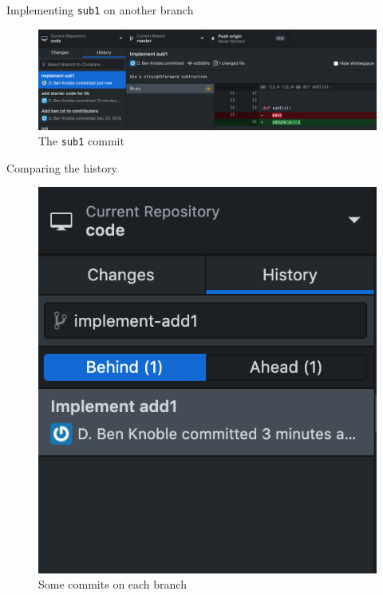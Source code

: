 \documentclass{beamer}
\theoremstyle{example}
\begin{document}
\begin{frame}{Implementing \texttt{sub1} on another branch}
    \begin{figure}
        \includegraphics[scale=0.4]{img/sub1}
        \caption{The \texttt{sub1} commit}
    \end{figure}
\end{frame}

\begin{frame}{Comparing the history}
    \begin{figure}
        \includegraphics[scale=0.4]{img/comparing}
        \caption{Some commits on each branch}
    \end{figure}
\end{frame}
\end{document}
